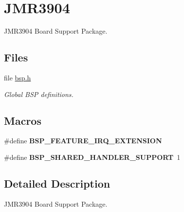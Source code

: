\hypertarget{group__RTEMSBSPsMIPSJMR3904}{}\section{J\+M\+R3904}
\label{group__RTEMSBSPsMIPSJMR3904}


J\+M\+R3904 Board Support Package.  


\subsection*{Files}
\begin{DoxyCompactItemize}
\item 
file \mbox{\hyperlink{bsps_2mips_2jmr3904_2include_2bsp_8h}{bsp.\+h}}
\begin{DoxyCompactList}\small\item\em Global B\+SP definitions. \end{DoxyCompactList}\end{DoxyCompactItemize}
\subsection*{Macros}
\begin{DoxyCompactItemize}
\item 
\mbox{\label{group__RTEMSBSPsMIPSJMR3904_ga5d7d631d3a14b7554160f14eb42f351b}} 
\#define {\bfseries B\+S\+P\+\_\+\+F\+E\+A\+T\+U\+R\+E\+\_\+\+I\+R\+Q\+\_\+\+E\+X\+T\+E\+N\+S\+I\+ON}
\item 
\mbox{\label{group__RTEMSBSPsMIPSJMR3904_ga2fe5e739729e5756a04cc73da64cc8ee}} 
\#define {\bfseries B\+S\+P\+\_\+\+S\+H\+A\+R\+E\+D\+\_\+\+H\+A\+N\+D\+L\+E\+R\+\_\+\+S\+U\+P\+P\+O\+RT}~1
\end{DoxyCompactItemize}


\subsection{Detailed Description}
J\+M\+R3904 Board Support Package. 

